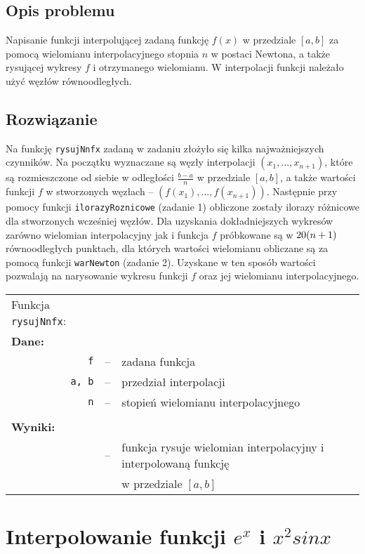 \documentclass[11pt]{mk-polish-lab-report}
\let\times\relax%
\DeclareMathOperator{\times}{\cdot}
\begin{document}
\subsection{Opis problemu}
Napisanie funkcji interpolującej zadaną funkcję $f(x)$ w przedziale $[a, b]$ za pomocą wielomianu interpolacyjnego stopnia $n$ w postaci Newtona, a także rysującej wykresy $f$ i otrzymanego wielomianu. W interpolacji funkcji należało użyć węzłów równoodległych.

\subsection{Rozwiązanie}
Na funkcję \texttt{rysujNnfx} zadaną w zadaniu złożyło się kilka najważniejszych czynników. Na początku wyznaczane są węzły interpolacji $(x_1, \ldots, x_{n+1})$, które są rozmieszczone od siebie w odległości $\frac{b-a}{n}$ w przedziale $[a,b]$, a także wartości funkcji $f$ w stworzonych węzłach -- $(f(x_1), \ldots, f(x_{n+1}))$. Następnie przy pomocy funkcji \texttt{ilorazyRoznicowe} (zadanie 1) obliczone zostały ilorazy różnicowe dla stworzonych wcześniej węzłów. Dla uzyskania dokładniejszych wykresów zarówno wielomian interpolacyjny jak i funkcja $f$ próbkowane są w $20 \times (n+1)$ równoodległych punktach, dla których wartości wielomianu obliczane są za pomocą funkcji \texttt{warNewton} (zadanie 2). Uzyskane w ten sposób wartości pozwalają na narysowanie wykresu funkcji $f$ oraz jej wielomianu interpolacyjnego.

\begin{longtable}[l]{r  c  l}
\multicolumn{1}{l}{Funkcja \texttt{rysujNnfx}:}&& \\
\multicolumn{1}{l}{\textbf{Dane:}}&& \\
\texttt{f}&--&zadana funkcja \\
\texttt{a, b}&--& przedział interpolacji \\
\texttt{n}&--& stopień wielomianu interpolacyjnego \\
&& \\
\multicolumn{1}{l}{\textbf{Wyniki:}}&& \\
&--&funkcja rysuje wielomian interpolacyjny i interpolowaną funkcję \\
&&w przedziale $[a,b]$ \\
\end{longtable}


\section{Interpolowanie funkcji $e^x$ i $x^2sin{x}$}
\end{document}
